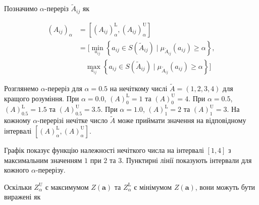 \documentclass[14pt, a4paper, oneside]{extarticle}
\numberwithin{equation}{section}
\begin{document}
Позначимо $\alpha$-переріз $\tilde{A}_{i j}$ як

\begin{equation}
\begin{aligned}
\left(A_{i j}\right)_{\alpha} & =\left[\left(A_{i j}\right)_{\alpha}^{\mathrm{L}},\left(A_{i j}\right)_{\alpha}^{\mathrm{U}}\right] \\
& =[\min _{a_{i j}}\left\{a_{i j} \in S\left(\tilde{A}_{i j}\right) \mid \mu_{\tilde{A}_{i j}}\left(a_{i j}\right) \geq \alpha\right\},\\
& \quad \max _{a_{i j}}\left\{a_{i j} \in S\left(\tilde{A}_{i j}\right) \mid \mu_{\tilde{A}_{i j}}\left(a_{i j}\right) \geq \alpha\right\}]
\end{aligned}
\end{equation}
\begin{flushleft}
\end{flushleft}

Розглянемо $\alpha$-переріз для $\alpha=0.5$ на нечіткому числі $\tilde{A} = (1,2,3,4)$ для кращого розуміння.
При $\alpha=0.0$, $\left(A\right)_{0}^{\mathrm{L}} = 1$ та $\left(A\right)_{0}^{\mathrm{U}} = 4$.
При $\alpha=0.5$, $\left(A\right)_{0.5}^{\mathrm{L}} = 1.5$ та $\left(A\right)_{0.5}^{\mathrm{U}} = 3.5$.
При $\alpha=1.0$, $\left(A\right)_{1}^{\mathrm{L}} = 2$ та $\left(A\right)_{1}^{\mathrm{U}} = 3$.
На кожному $\alpha$-перерізі нечітке число $\tilde{A}$ може приймати значення на відповідному інтервалі $\left[\left(A\right)_{\alpha}^{\mathrm{L}},\left(A\right)_{\alpha}^{\mathrm{U}}\right]$.

Графік показує функцію належності нечіткого числа на інтервалі $[1,4]$ з максимальним значенням $1$ при $2$ та $3$. Пунктирні лінії показують інтервали для кожного $\alpha$-перерізу.

Оскільки $Z_{\alpha}^{\mathrm{U}}$ є максимумом $Z(\mathbf{a})$ та $Z_{\alpha}^{\mathrm{L}}$ є мінімумом $Z(\mathbf{a})$, вони можуть бути виражені як
\end{document}
